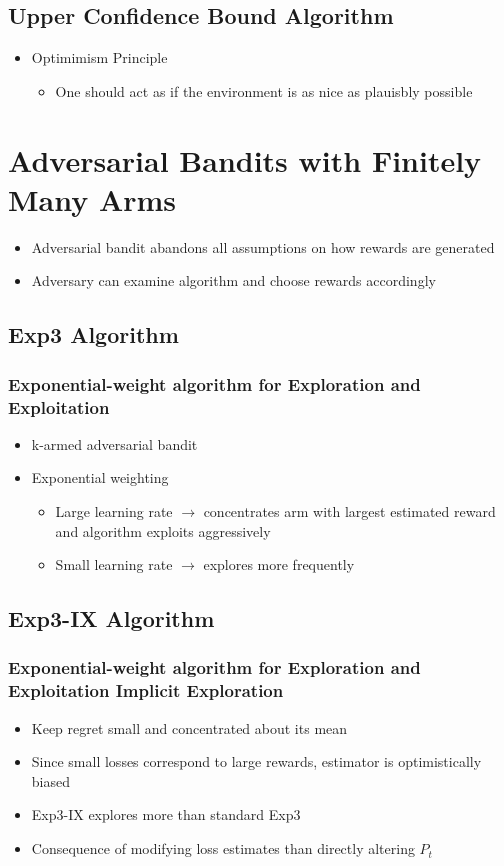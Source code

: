 \documentclass{article}
\begin{document}
\subsection{Upper Confidence Bound Algorithm}
\begin{itemize}
	\item Optimimism Principle
	\begin{itemize}
		\item One should act as if the environment is as nice as plauisbly possible
	\end{itemize}
\end{itemize}

\section{Adversarial Bandits with Finitely Many Arms}
\begin{itemize}
	\item Adversarial bandit abandons all assumptions on how rewards are generated
	\item Adversary can examine algorithm and choose rewards accordingly
\end{itemize}
\subsection{Exp3 Algorithm}
\subsubsection{Exponential-weight algorithm for Exploration and Exploitation}
\begin{itemize}
	\item k-armed adversarial bandit
	\item Exponential weighting
	\begin{itemize}
		\item Large learning rate $\rightarrow$ concentrates arm with largest estimated reward and algorithm exploits aggressively
		\item Small learning rate $\rightarrow$ explores more frequently
	\end{itemize}
\end{itemize}
\subsection{Exp3-IX Algorithm}
\subsubsection{Exponential-weight algorithm for Exploration and Exploitation Implicit Exploration}
\begin{itemize}
	\item Keep regret small and concentrated about its mean
	\item Since small losses correspond to large rewards, estimator is optimistically biased
	\item Exp3-IX explores more than standard Exp3
	\item Consequence of modifying loss estimates than directly altering $P_{t}$
\end{itemize}
\end{document}
